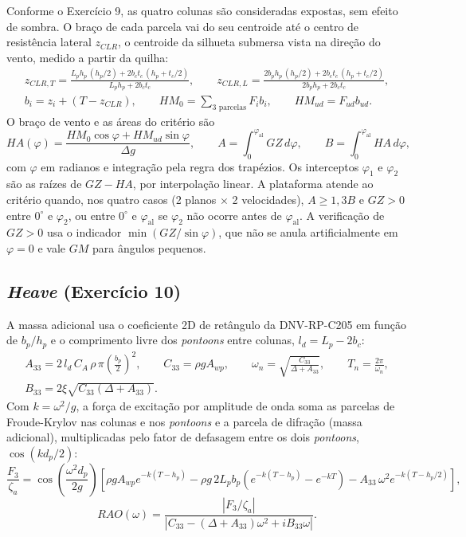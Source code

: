 \documentclass[11pt,a4paper]{article}
\newcommand{\phial}{\varphi_{\mathrm{al}}}
\begin{document}
Conforme o Exercício 9, as quatro colunas são consideradas expostas, sem efeito de sombra. O
braço de cada parcela vai do seu centroide até o centro de resistência lateral $z_{CLR}$, o
centroide da silhueta submersa vista na direção do vento, medido a partir da quilha:
\begin{gather}
z_{CLR,T} = \frac{L_p h_p \,(h_p/2) + 2 b_c t_c\,(h_p + t_c/2)}{L_p h_p + 2 b_c t_c}, \qquad
z_{CLR,L} = \frac{2 b_p h_p \,(h_p/2) + 2 b_c t_c\,(h_p + t_c/2)}{2 b_p h_p + 2 b_c t_c}, \\
b_i = z_i + (T - z_{CLR}), \qquad HM_0 = \sum_{\text{3 parcelas}} F_i b_i, \qquad HM_{ud} = F_{ud} b_{ud}.
\end{gather}
O braço de vento e as áreas do critério são
\begin{equation}
HA(\varphi) = \frac{HM_0\cos\varphi + HM_{ud}\sin\varphi}{\Delta g}, \qquad
A = \int_0^{\phial} GZ\, d\varphi, \qquad B = \int_0^{\phial} HA\, d\varphi ,
\end{equation}
com $\varphi$ em radianos e integração pela regra dos trapézios. Os interceptos $\varphi_1$ e
$\varphi_2$ são as raízes de $GZ - HA$, por interpolação linear. A plataforma atende ao critério
quando, nos quatro casos (2 planos $\times$ 2 velocidades), $A \ge 1{,}3B$ e $GZ > 0$ entre
$0^\circ$ e $\varphi_2$, ou entre $0^\circ$ e $\phial$ se $\varphi_2$ não ocorre antes de $\phial$.
A verificação de $GZ>0$ usa o indicador $\min(GZ/\sin\varphi)$, que não se anula
artificialmente em $\varphi = 0$ e vale $GM$ para ângulos pequenos.

\subsection{\emph{Heave} (Exercício 10)}

A massa adicional usa o coeficiente 2D de retângulo da DNV-RP-C205 em função de $b_p/h_p$ e o
comprimento livre dos \emph{pontoons} entre colunas, $l_d = L_p - 2 b_c$:
\begin{gather}
A_{33} = 2\, l_d\, C_A\, \rho\, \pi \left(\frac{b_p}{2}\right)^2, \qquad
C_{33} = \rho g A_{wp}, \qquad
\omega_n = \sqrt{\frac{C_{33}}{\Delta + A_{33}}}, \qquad T_n = \frac{2\pi}{\omega_n}, \\
B_{33} = 2\xi\sqrt{C_{33}(\Delta + A_{33})} .
\end{gather}
Com $k = \omega^2/g$, a força de excitação por amplitude de onda soma as parcelas de
Froude-Krylov nas colunas e nos \emph{pontoons} e a parcela de difração (massa adicional),
multiplicadas pelo fator de defasagem entre os dois \emph{pontoons}, $\cos(k d_p/2)$:
\begin{equation}
\frac{F_3}{\zeta_a} = \cos\!\left(\frac{\omega^2 d_p}{2g}\right)\left[
\rho g A_{wp} e^{-k(T-h_p)}
- \rho g\, 2 L_p b_p \left(e^{-k(T-h_p)} - e^{-kT}\right)
- A_{33}\,\omega^2 e^{-k(T-h_p/2)} \right],
\end{equation}
\begin{equation}
RAO(\omega) = \frac{|F_3/\zeta_a|}{\left|C_{33} - (\Delta + A_{33})\omega^2 + i B_{33}\omega\right|} .
\end{equation}
\end{document}
